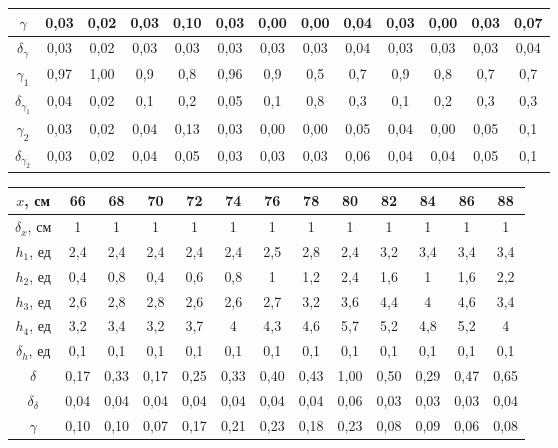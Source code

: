 \documentclass[a4paper, 12pt]{article}%
\begin{document}
\begin{enumerate}
\begin{table}[h!]
\begin{center}
\begin{tabular}{|c|c|c|c|c|c|c|c|c|c|c|c|c|}
$\gamma$            & 0,03 & 0,02 & 0,03 & 0,10 & 0,03 & 0,00 & 0,00 & 0,04 & 0,03 & 0,00 & 0,03 & 0,07 \\ \hline
$\delta_{\gamma}$   & 0,03 & 0,02 & 0,03 & 0,03 & 0,03 & 0,03 & 0,03 & 0,04 & 0,03 & 0,03 & 0,03 & 0,04 \\ \hline
$\gamma_1$          & 0,97 & 1,00 & 0,9  & 0,8  & 0,96 & 0,9  & 0,5  & 0,7  & 0,9  & 0,8  & 0,7  & 0,7  \\ \hline
$\delta_{\gamma_1}$ & 0,04 & 0,02 & 0,1  & 0,2  & 0,05 & 0,1  & 0,8  & 0,3  & 0,1  & 0,2  & 0,3  & 0,3  \\ \hline
$\gamma_2$          & 0,03 & 0,02 & 0,04 & 0,13 & 0,03 & 0,00 & 0,00 & 0,05 & 0,04 & 0,00 & 0,05 & 0,1  \\ \hline
$\delta_{\gamma_2}$ & 0,03 & 0,02 & 0,04 & 0,05 & 0,03 & 0,03 & 0,03 & 0,06 & 0,04 & 0,04 & 0,05 & 0,1  \\ \hline
\end{tabular}
\begin{tabular}{|c|c|c|c|c|c|c|c|c|c|c|c|c|}
\hline
$x$, см             & 66   & 68   & 70   & 72   & 74   & 76   & 78   & 80   & 82   & 84   & 86   & 88   \\ \hline
$\delta_x$, см      & 1    & 1    & 1    & 1    & 1    & 1    & 1    & 1    & 1    & 1    & 1    & 1    \\ \hline
$h_1$, ед           & 2,4  & 2,4  & 2,4  & 2,4  & 2,4  & 2,5  & 2,8  & 2,4  & 3,2  & 3,4  & 3,4  & 3,4  \\ \hline
$h_2$, ед           & 0,4  & 0,8  & 0,4  & 0,6  & 0,8  & 1    & 1,2  & 2,4  & 1,6  & 1    & 1,6  & 2,2  \\ \hline
$h_3$, ед           & 2,6  & 2,8  & 2,8  & 2,6  & 2,6  & 2,7  & 3,2  & 3,6  & 4,4  & 4    & 4,6  & 3,4  \\ \hline
$h_4$, ед           & 3,2  & 3,4  & 3,2  & 3,7  & 4    & 4,3  & 4,6  & 5,7  & 5,2  & 4,8  & 5,2  & 4    \\ \hline
$\delta_h$, ед      & 0,1  & 0,1  & 0,1  & 0,1  & 0,1  & 0,1  & 0,1  & 0,1  & 0,1  & 0,1  & 0,1  & 0,1  \\ \hline
$\delta$            & 0,17 & 0,33 & 0,17 & 0,25 & 0,33 & 0,40 & 0,43 & 1,00 & 0,50 & 0,29 & 0,47 & 0,65 \\ \hline
$\delta_{\delta}$   & 0,04 & 0,04 & 0,04 & 0,04 & 0,04 & 0,04 & 0,04 & 0,06 & 0,03 & 0,03 & 0,03 & 0,04 \\ \hline
$\gamma$            & 0,10 & 0,10 & 0,07 & 0,17 & 0,21 & 0,23 & 0,18 & 0,23 & 0,08 & 0,09 & 0,06 & 0,08 \\ \hline

\end{tabular}
\end{center}
\end{table}
\end{enumerate}
\end{document}
